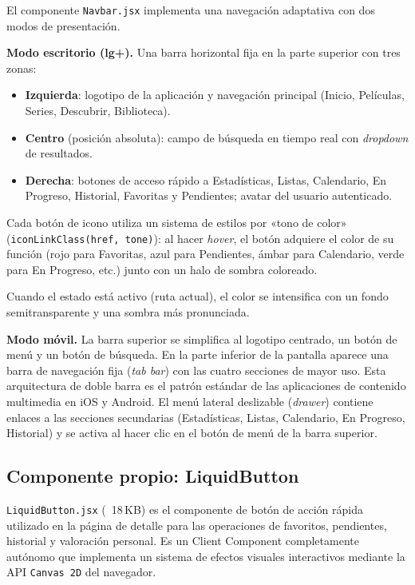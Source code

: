El componente \texttt{Navbar.jsx} implementa una navegación adaptativa con dos modos de presentación.

\textbf{Modo escritorio (lg+).} Una barra horizontal fija en la parte superior con tres zonas:
\begin{itemize}
\item \textbf{Izquierda}: logotipo de la aplicación y navegación principal (Inicio, Películas, Series, Descubrir, Biblioteca).
\item \textbf{Centro} (posición absoluta): campo de búsqueda en tiempo real con \textit{dropdown} de resultados.
\item \textbf{Derecha}: botones de acceso rápido a Estadísticas, Listas, Calendario, En Progreso, Historial, Favoritas y Pendientes; avatar del usuario autenticado.
\end{itemize}

Cada botón de icono utiliza un sistema de estilos por «tono de color» (\texttt{iconLinkClass(href, tone)}): al hacer \textit{hover}, el botón adquiere el color de su función (rojo para Favoritas, azul para Pendientes, ámbar para Calendario, verde para En Progreso, etc.) junto con un halo de sombra coloreado.

Cuando el estado está activo (ruta actual), el color se intensifica con un fondo semitransparente y una sombra más pronunciada.

\textbf{Modo móvil.} La barra superior se simplifica al logotipo centrado, un botón de menú y un botón de búsqueda. En la parte inferior de la pantalla aparece una barra de navegación fija (\textit{tab bar}) con las cuatro secciones de mayor uso. Esta arquitectura de doble barra es el patrón estándar de las aplicaciones de contenido multimedia en iOS y Android. El menú lateral deslizable (\textit{drawer}) contiene enlaces a las secciones secundarias (Estadísticas, Listas, Calendario, En Progreso, Historial) y se activa al hacer clic en el botón de menú de la barra superior.

\subsection{Componente propio: LiquidButton}

\texttt{LiquidButton.jsx} (~18\,KB) es el componente de botón de acción rápida utilizado en la página de detalle para las operaciones de favoritos, pendientes, historial y valoración personal. Es un Client Component completamente autónomo que implementa un sistema de efectos visuales interactivos mediante la API \texttt{Canvas 2D} del navegador.

